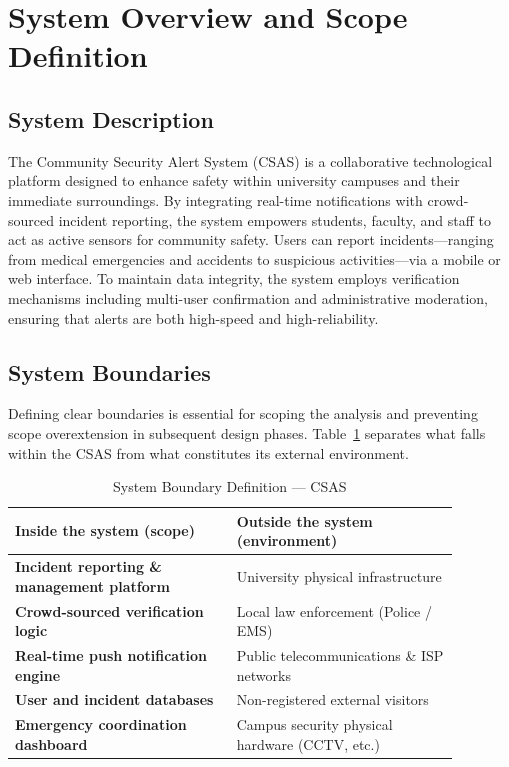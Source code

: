 \documentclass[12pt, onecolumn]{IEEEtran}
\begin{document}
\section{System Overview and Scope Definition}

\subsection{System Description}

The Community Security Alert System (CSAS) is a collaborative
technological platform designed to enhance safety within university
campuses and their immediate surroundings. By integrating real-time
notifications with crowd-sourced incident reporting, the system empowers
students, faculty, and staff to act as active sensors for community
safety. Users can report incidents---ranging from medical emergencies
and accidents to suspicious activities---via a mobile or web interface.
To maintain data integrity, the system employs verification mechanisms
including multi-user confirmation and administrative moderation,
ensuring that alerts are both high-speed and high-reliability.

\subsection{System Boundaries}

Defining clear boundaries is essential for scoping the analysis and
preventing scope overextension in subsequent design phases.
Table~\ref{tab:boundaries} separates what falls within the CSAS from
what constitutes its external environment.

\begin{table}[h]
\centering
\caption{System Boundary Definition --- CSAS}
\label{tab:boundaries}
\renewcommand{\arraystretch}{1.3}
\begin{tabular}{>{\bfseries\small}p{0.44\linewidth}
                >{\small}p{0.44\linewidth}}
\toprule
\textbf{Inside the system (scope)} &
\textbf{Outside the system (environment)} \\
\midrule
Incident reporting \& management platform
    & University physical infrastructure \\
\rowcolor{rowgray}
Crowd-sourced verification logic
    & Local law enforcement (Police / EMS) \\
Real-time push notification engine
    & Public telecommunications \& ISP networks \\
\rowcolor{rowgray}
User and incident databases
    & Non-registered external visitors \\
Emergency coordination dashboard
    & Campus security physical hardware (CCTV, etc.) \\
\bottomrule
\end{tabular}
\end{table}
\end{document}
